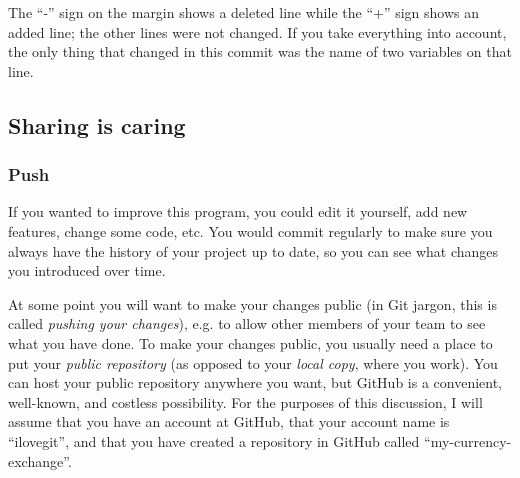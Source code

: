 The ``-'' sign on the margin shows a deleted line while the ``+'' sign
shows an added line; the other lines were not changed. 
If you take everything into account, the only thing that changed
in this commit was the name of two variables on that line. 

\subsection{Sharing is caring}
\label{sec:sharing-caring}

\subsubsection{Push}
\label{sec:push}

If you wanted to improve this program, you could edit it yourself, add
new features, change some code, etc. You would commit regularly to
make sure you always have the history of your project up to date, so
you can see what changes you introduced over time. 

At some point you will want to make your changes public (in Git
jargon, this is called \emph{pushing your changes}), e.g. to allow
other members of your team to see what you have done. To make your
changes public, you usually need a place to put your \emph{public
repository} (as opposed to your \emph{local copy}, where you
work). You can host your public repository anywhere you want, but
GitHub is a convenient, well-known, and costless possibility. For the
purposes of this discussion, I will assume that you have an account at
GitHub, that your account name is ``ilovegit'', and that you have
created a repository in GitHub called ``my-currency-exchange''. 




